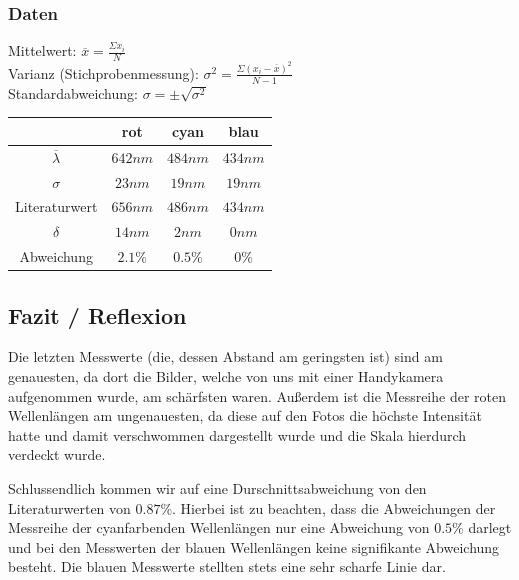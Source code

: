 \documentclass[12pt, a4paper]{article}
\begin{document}
\subsubsection{Daten}
\large
Mittelwert: $\overline{x} = \frac{\Sigma x_i}{N}$\\
Varianz (Stichprobenmessung): $\sigma^2 = \frac{\Sigma(x_i-\overline{x})^2}{N-1}$\\
Standardabweichung: $\sigma = \pm \sqrt{\sigma^2}$
\normalsize

\vspace{5mm}

\begin{tabular}{ |c|c|c|c| }
    \hline
    & rot & cyan & blau \\
    \hline
    \hline
    $\overline{\lambda}$ & $642nm$ & $484nm$ & $434nm$ \\
    \hline
    $\sigma$ & $23nm$ & $19nm$ & $19nm$ \\
    \hline
    \hline
    Literaturwert & $656nm$ & $486nm$ & $434nm$ \\
    \hline
    $\delta$ & $14nm$ & $2nm$ & $0nm$ \\
    \hline
    Abweichung & $2.1\%$ & $0.5\%$ & $0\%$ \\
    \hline
\end{tabular}

\newpage

\subsection{Fazit / Reflexion}
Die letzten Messwerte (die, dessen Abstand am geringsten ist) sind am genauesten,
da dort die Bilder, welche von uns mit einer Handykamera aufgenommen wurde,
am schärfsten waren.
Außerdem ist die Messreihe der roten Wellenlängen am ungenauesten,
da diese auf den Fotos die höchste Intensität hatte und damit
verschwommen dargestellt wurde und die Skala hierdurch verdeckt wurde.

Schlussendlich kommen wir auf eine Durschnittsabweichung von den Literaturwerten von $0.87\%$.
Hierbei ist zu beachten, dass die Abweichungen der Messreihe der cyanfarbenden
Wellenlängen nur eine Abweichung von $0.5\%$ darlegt und bei den Messwerten der
blauen Wellenlängen keine signifikante Abweichung besteht. Die blauen Messwerte
stellten stets eine sehr scharfe Linie dar.
\end{document}

